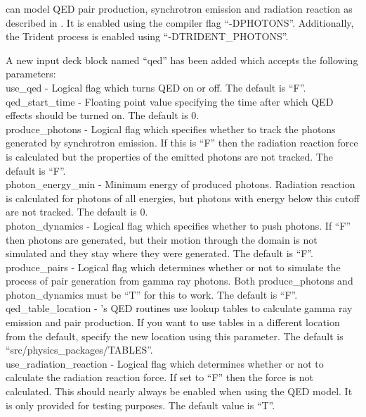 {\EPOCH} can model QED pair production, synchrotron emission and
radiation reaction as described in \citet{Duclous}.
It is enabled using the compiler flag ``-DPHOTONS''. Additionally,
the Trident process is enabled using ``-DTRIDENT\_PHOTONS''.

A new input deck block named ``qed'' has been added which accepts the
following parameters:\\

{\emphtext use\_qed} - Logical flag which turns QED on or off. The default
  is ``F''.\\

{\emphtext qed\_start\_time} - Floating point value specifying the time after
  which QED effects should be turned on. The default is 0.\\

{\emphtext produce\_photons} - Logical flag which specifies whether to track
  the photons generated by synchrotron emission. If this is ``F'' then the
  radiation reaction force is calculated but the properties of the emitted
  photons are not tracked. The default is ``F''.\\

{\emphtext photon\_energy\_min} - Minimum energy of produced photons.
  Radiation reaction is calculated for photons of all energies, but photons
  with energy below this cutoff are not tracked.  The default is 0.\\

{\emphtext photon\_dynamics} - Logical flag which specifies whether to push
  photons.  If ``F'' then photons are generated, but their motion through the
  domain is not simulated and they stay where they were generated. The default
  is ``F''.\\

{\emphtext produce\_pairs} - Logical flag which determines whether or not to
  simulate the process of pair generation from gamma ray photons.  Both
  produce\_photons and photon\_dynamics must be ``T'' for this to work. The
  default is ``F''.\\

{\emphtext qed\_table\_location} - {\EPOCH}'s QED routines use lookup tables to
  calculate gamma ray emission and pair production. If you want to use tables
  in a different location from the default, specify the new location using
  this parameter.  The default is ``src/physics\_packages/TABLES''.\\

{\emphtext use\_radiation\_reaction} - Logical flag which determines whether
  or not to calculate the radiation reaction force. If set to ``F'' then
  the force is not calculated. This should nearly always be enabled when
  using the QED model. It is only provided for testing purposes.
  The default value is ``T''.\\

